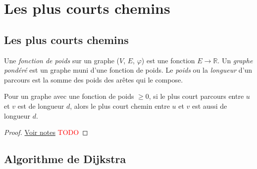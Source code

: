 \section{Les plus courts chemins}
\subsection{Les plus courts chemins}
\begin{mydef}
  Une \emph{fonction de poids} sur un graphe ($V$, $E$, $\varphi$) est une fonction $E \to \mathbb{R}$. Un \emph{graphe pondéré} est un graphe muni d’une fonction de poids. Le \emph{poids} ou la \emph{longueur} d’un parcours est la somme des poids des arêtes qui le compose.
\end{mydef}

\begin{mytheo} 
  Pour un graphe avec une fonction de poids $\geq 0$, si le plus court parcours entre $u$ et $v$ est de longueur $d$, alors le plus court chemin entre $u$ et $v$ est aussi de longueur $d$.
  \begin{proof}
     \href{https://dl.dropboxusercontent.com/u/44092863/Graph_Theory_Romain_Capron.pdf}{Voir notes} \textcolor{red}{TODO}
  \end{proof}
\end{mytheo}

\subsection{Algorithme de Dijkstra}
\begin{myalgo}
\end{myalgo}

